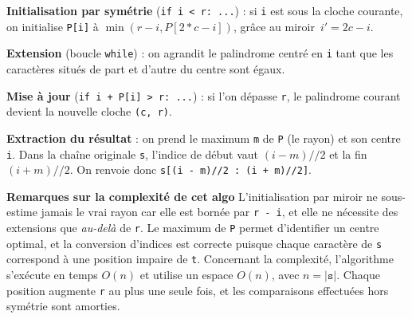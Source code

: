 \documentclass[12pt, a4paper]{article}
\begin{document}
\textbf{Initialisation par symétrie} (\lstinline{if i < r: ...}) : si \lstinline{i} est sous la cloche courante, on initialise \lstinline{P[i]} à \(\min(r - i, P[2 * c - i])\), grâce au miroir \(\,i' = 2c - i\).  

\textbf{Extension} (boucle \lstinline{while}) : on agrandit le palindrome centré en \lstinline{i} tant que les caractères situés de part et d’autre du centre sont égaux.  

\textbf{Mise à jour} (\lstinline{if i + P[i] > r: ...}) : si l’on dépasse \lstinline{r}, le palindrome courant devient la nouvelle cloche \lstinline{(c, r)}.  

\textbf{Extraction du résultat} : on prend le maximum \lstinline{m} de \lstinline{P} (le rayon) et son centre \lstinline{i}. Dans la chaîne originale \texttt{s}, l’indice de début vaut \((i - m) // 2\) et la fin \((i + m) // 2\). On renvoie donc \lstinline{s[(i - m)//2 : (i + m)//2]}.

\textbf{Remarques sur la complexité de cet algo}\newline
L’initialisation par miroir ne sous-estime jamais le vrai rayon car elle est bornée par \lstinline{r - i}, et elle ne nécessite des extensions que \emph{au-delà} de \lstinline{r}. Le maximum de \lstinline{P} permet d’identifier un centre optimal, et la conversion d’indices est correcte puisque chaque caractère de \texttt{s} correspond à une position impaire de \texttt{t}.  
Concernant la complexité, l’algorithme s’exécute en temps \(O(n)\) et utilise un espace \(O(n)\), avec \(n = |\texttt{s}|\). Chaque position augmente \lstinline{r} au plus une seule fois, et les comparaisons effectuées hors symétrie sont amorties.
\end{document}
